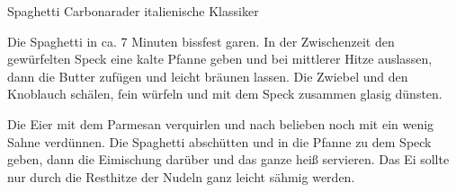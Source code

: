 \begin{recipe}{Spaghetti Carbonara}{der italienische Klassiker}
  \inglist

  \steps
  Die Spaghetti in ca. 7 Minuten bissfest garen. In der Zwischenzeit den gewürfelten Speck
  eine kalte Pfanne geben und bei mittlerer Hitze auslassen, dann die Butter zufügen und leicht
  bräunen lassen. Die Zwiebel und den Knoblauch schälen, fein würfeln und mit dem Speck
  zusammen glasig dünsten.

  Die Eier mit dem Parmesan verquirlen und nach belieben noch mit ein wenig Sahne
  verdünnen. Die Spaghetti abschütten und in die Pfanne zu dem Speck geben, dann die
  Eimischung darüber und das ganze heiß servieren. Das Ei sollte nur durch die Resthitze
  der Nudeln ganz leicht sähmig werden.
\end{recipe}
